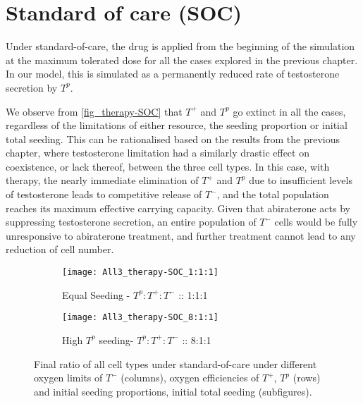 \section{Standard of care (SOC)}
Under standard-of-care, the drug is applied from the beginning of the simulation at the maximum tolerated dose for all the cases explored in the previous chapter. In our model, this is simulated as a permanently reduced rate of testosterone secretion by $T^p$.

We observe from \autoref{fig_therapy-SOC} that $T^+$ and $T^p$ go extinct in all the cases, regardless of the limitations of either resource, the seeding proportion or initial total seeding. This can be rationalised based on the results from the previous chapter, where testosterone limitation had a similarly drastic effect on coexistence, or lack thereof, between the three cell types. In this case, with therapy, the nearly immediate elimination of $T^+$ and $T^p$ due to insufficient levels of testosterone leads to competitive release of $T^-$, and the total population reaches its maximum effective carrying capacity. Given that abiraterone acts by suppressing testosterone secretion, an entire population of $T^-$ cells would be fully unresponsive to abiraterone treatment, and further treatment cannot lead to any reduction of cell number.

\begin{figure}[h!]
  \centering
  \begin{subfigure}[b]{\textwidth}
    \centering
    \texttt{[image: All3\_therapy-SOC\_1:1:1]}
    \caption{Equal Seeding - $T^p:T^+:T^-$ :: 1:1:1}
    \label{fig_therapy-SOC_1:1:1}
  \end{subfigure}
  \begin{subfigure}[b]{\textwidth}
    \centering
    \texttt{[image: All3\_therapy-SOC\_8:1:1]}
    \caption{High $T^p$ seeding- $T^p:T^+:T^-$ :: 8:1:1}
    \label{fig_therapy-SOC_8:1:1}
  \end{subfigure}
  \caption[Final ratio of all cell types under standard-of-care]{Final ratio of all cell types under standard-of-care under different oxygen limits of $T^-$ (columns), oxygen efficiencies of $T^+$, $T^p$ (rows) and initial seeding proportions, initial total seeding (subfigures).}
  \label{fig_therapy-SOC}
\end{figure}

\newpage

